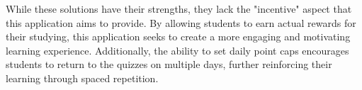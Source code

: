 While these solutions have their strengths, they lack the "incentive" aspect that this application aims to provide. By allowing students to earn actual rewards for their studying, this application seeks to create a more engaging and motivating learning experience.\cite{smithsonian2016benefits} Additionally, the ability to set daily point caps encourages students to return to the quizzes on multiple days, further reinforcing their learning through spaced repetition.